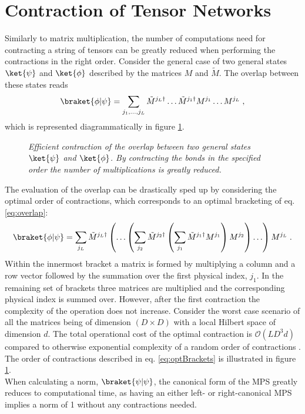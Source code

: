 \section*{Contraction of Tensor Networks}
Similarly to matrix multiplication, the number of computations need for contracting a string of tensors can be greatly reduced when performing the contractions in the right order. Consider the general case of two general states $\ket{\psi}$ and $\ket{\phi}$ described by the matrices $M$ and $\tilde{M}$. The overlap between these states reads
\begin{equation}
	\braket{\phi | \psi} = \sum_{j_1 , \ldots , j_L} \tilde{M}^{j_L \dag} \ldots \tilde{M}^{j_1 \dag} M^{j_1} \ldots M^{j_L} \; , 
	\label{eq:overlap}
\end{equation}
which is represented diagrammatically in figure \ref{fig:effCont}.
\begin{figure}[h!]
	\centering
	
	\caption{\textit{Efficient contraction of the overlap between two general states $\ket{\psi}$ and $\ket{\phi}$. By contracting the bonds in the specified order the number of multiplications is greatly reduced.}}
	\label{fig:effCont}
\end{figure}
The evaluation of the overlap can be drastically sped up by considering the optimal order of contractions, which corresponds to an optimal bracketing of eq. \eqref{eq:overlap}:
\begin{equation}
	\braket{\phi | \psi} = \sum_{j_L} \tilde{M}^{j_L \dag} \left( \ldots \left( \sum_{j_2} \tilde{M}^{j_2 \dag} \left( \sum_{j_1} \tilde{M}^{j_1 \dag} M^{j_1} \right) M^{j_2} \right) \ldots \right) M^{j_L} \; .
	\label{eq:optBrackets}
\end{equation}  
Within the innermost bracket a matrix is formed by multiplying a column and a row vector followed by the summation over the first physical index, $j_1$. In the remaining set of brackets three matrices are multiplied and the corresponding physical index is summed over. However, after the first contraction the complexity of the operation does not increase. Consider the worst case scenario of all the matrices being of dimension $(D \times D)$ with a local Hilbert space of dimension $d$. The total operational cost of the optimal contraction is $\mathcal{O}(L D^3 d)$ compared to otherwise exponential complexity of a random order of contractions \cite{schollwock}. The order of contractions described in eq. \eqref{eq:optBrackets} is illustrated in figure \ref{fig:effCont}.\\
When calculating a norm, $\braket{\psi | \psi}$, the canonical form of the MPS greatly reduces to computational time, as having an either left- or right-canonical MPS implies a norm of 1 without any contractions needed.